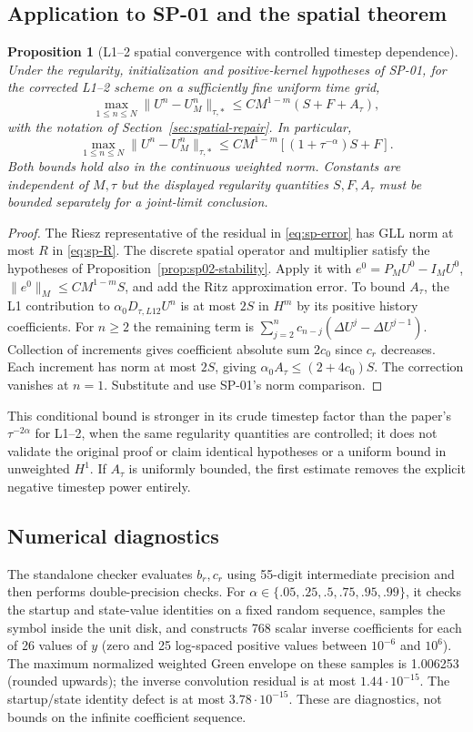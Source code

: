 \documentclass[11pt,a4paper]{amsart}
\theoremstyle{remark}
\theoremstyle{plain}
\newtheorem{proposition}{Proposition}[section]
\theoremstyle{remark}
\numberwithin{equation}{section}
\begin{document}
\subsection{Application to SP-01 and the spatial theorem}
\begin{proposition}[L1--2 spatial convergence with controlled timestep dependence]\label{prop:sp02-spatial}
Under the regularity, initialization and positive-kernel hypotheses of SP-01, for the corrected L1--2 scheme on a sufficiently fine uniform time grid,
\[
 \max_{1\le n\le N}\|U^n-U_M^n\|_{\tau,*}
 \le C M^{1-m}(S+F+A_\tau),
\]
with the notation of Section~\ref{sec:spatial-repair}. In particular,
\[
 \max_{1\le n\le N}\|U^n-U_M^n\|_{\tau,*}
 \le C M^{1-m}[(1+\tau^{-\alpha})S+F].
\]
Both bounds hold also in the continuous weighted norm. Constants are independent of $M,\tau$ but the displayed regularity quantities $S,F,A_\tau$ must be bounded separately for a joint-limit conclusion.
\end{proposition}
\begin{proof}
The Riesz representative of the residual in \eqref{eq:sp-error} has GLL norm at most $R$ in \eqref{eq:sp-R}. The discrete spatial operator and multiplier satisfy the hypotheses of Proposition~\ref{prop:sp02-stability}. Apply it with $e^0=P_MU^0-I_MU^0$, $\|e^0\|_M\le CM^{1-m}S$, and add the Ritz approximation error. To bound $A_\tau$, the L1 contribution to $\alpha_0 D_{\tau,L12}U^n$ is at most $2S$ in $H^m$ by its positive history coefficients. For $n\ge2$ the remaining term is $\sum_{j=2}^nc_{n-j}(\Delta U^j-\Delta U^{j-1})$. Collection of increments gives coefficient absolute sum $2c_0$ since $c_r$ decreases. Each increment has norm at most $2S$, giving $\alpha_0 A_\tau\le(2+4c_0)S$. The correction vanishes at $n=1$. Substitute and use SP-01's norm comparison.
\end{proof}
This conditional bound is stronger in its crude timestep factor than the paper's $\tau^{-2\alpha}$ for L1--2, when the same regularity quantities are controlled; it does not validate the original proof or claim identical hypotheses or a uniform bound in unweighted $H^1$. If $A_\tau$ is uniformly bounded, the first estimate removes the explicit negative timestep power entirely.

\subsection{Numerical diagnostics}
The standalone checker evaluates $b_r,c_r$ using 55-digit intermediate precision and then performs double-precision checks. For $\alpha\in\{.05,.25,.5,.75,.95,.99\}$, it checks the startup and state-value identities on a fixed random sequence, samples the symbol inside the unit disk, and constructs 768 scalar inverse coefficients for each of 26 values of $y$ (zero and 25 log-spaced positive values between $10^{-6}$ and $10^6$). The maximum normalized weighted Green envelope on these samples is 1.006253 (rounded upwards); the inverse convolution residual is at most $1.44\cdot10^{-15}$. The startup/state identity defect is at most $3.78\cdot10^{-15}$. These are diagnostics, not bounds on the infinite coefficient sequence.
\end{document}
